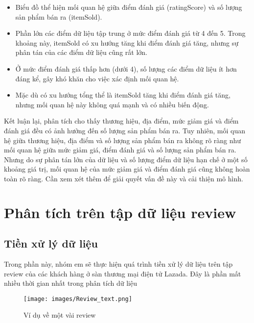 \begin{itemize}
    \item Biểu đồ thể hiện mối quan hệ giữa điểm đánh giá (ratingScore) và số lượng sản phẩm bán ra (itemSold).
    
    \item Phần lớn các điểm dữ liệu tập trung ở mức điểm đánh giá từ 4 đến 5. Trong khoảng này, itemSold có xu hướng tăng khi điểm đánh giá tăng, nhưng sự phân tán của các điểm dữ liệu cũng rất lớn.

    \item Ở mức điểm đánh giá thấp hơn (dưới 4), số lượng các điểm dữ liệu ít hơn đáng kể, gây khó khăn cho việc xác định mối quan hệ.
    
    \item Mặc dù có xu hướng tổng thể là itemSold tăng khi điểm đánh giá tăng, nhưng mối quan hệ này không quá mạnh và có nhiều biến động.
\end{itemize}


Kết luận lại, phân tích cho thấy thương hiệu, địa điểm, mức giảm giá và điểm đánh giá đều có ảnh hưởng đến số lượng sản phẩm bán ra. Tuy nhiên, mối quan hệ giữa thương hiệu, địa điểm và số lượng sản phẩm bán ra không rõ ràng như mối quan hệ giữa mức giảm giá, điểm đánh giá và số lượng sản phẩm bán ra. Nhưng do sự phân tán lớn của dữ liệu và số lượng điểm dữ liệu hạn chế ở một số khoảng giá trị, mối quan hệ của mức giảm giá và điểm đánh giá cũng không hoàn toàn rõ ràng. Cần xem xét thêm để giải quyết vấn đề này và cải thiện mô hình.

\section{Phân tích trên tập dữ liệu review}
\subsection{Tiền xử lý dữ liệu}
Trong phần này, nhóm em sẽ thực hiện quá trình tiền xử lý dữ liệu trên tập review của các khách hàng ở sàn thương mại điện tử Lazada. Đây là phần mất nhiều thời gian nhất trong phân tích dữ liệu

\begin{center}
    \begin{figure}[htb] %
        \centering
        \texttt{[image: images/Review\_text.png]}
        \caption{Ví dụ về một vài review}
    \end{figure}
\end{center}

